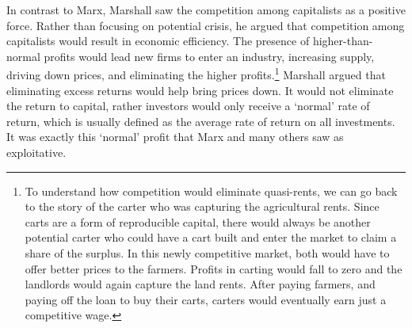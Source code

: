 In contrast to Marx, Marshall saw the competition among capitalists as a positive force. Rather than focusing on potential crisis, he argued that competition among capitalists would result in economic efficiency.
The presence of higher-than-normal profits would lead new firms to enter an industry, increasing supply, driving down prices, and eliminating the higher profits.\footnote{To understand how competition would eliminate quasi-rents, we can go back to the story of the carter who was capturing the agricultural rents. Since carts are a form of reproducible capital, there would always be another potential carter who could have a cart built and enter the market to claim a share of the surplus. In this newly competitive market, both would have to offer better prices to the farmers. Profits in carting would fall to zero and the landlords would again capture the land rents. After paying farmers, and paying off the loan to buy their carts, carters would eventually earn just a competitive wage.} 
Marshall argued that eliminating  excess returns would help bring prices down. It would not eliminate the return to capital, rather investors would only receive a `normal'  rate of return, which is usually defined as the average rate of return on all investments. It was exactly this `normal' profit that Marx and many others saw as exploitative.%

